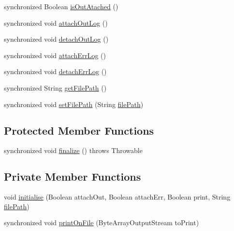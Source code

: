 \begin{DoxyCompactItemize}
\item 
synchronized Boolean \hyperlink{classit_1_1emarolab_1_1cagg_1_1debugging_1_1StandaloneDebuggingText_1_1ConsoleLogRidirector_a804a55248c706a5db8e875ab8ed59cf7}{is\-Out\-Atached} ()
\item 
synchronized void \hyperlink{classit_1_1emarolab_1_1cagg_1_1debugging_1_1StandaloneDebuggingText_1_1ConsoleLogRidirector_a538da7a18aa85fae0a67425392e3fa26}{attach\-Out\-Log} ()
\item 
synchronized void \hyperlink{classit_1_1emarolab_1_1cagg_1_1debugging_1_1StandaloneDebuggingText_1_1ConsoleLogRidirector_a09c385b8ae75ac69a66ee5d28a423b44}{detach\-Out\-Log} ()
\item 
synchronized void \hyperlink{classit_1_1emarolab_1_1cagg_1_1debugging_1_1StandaloneDebuggingText_1_1ConsoleLogRidirector_a64337c563f96a2a9409d033805e8e7bb}{attach\-Err\-Log} ()
\item 
synchronized void \hyperlink{classit_1_1emarolab_1_1cagg_1_1debugging_1_1StandaloneDebuggingText_1_1ConsoleLogRidirector_a7a3fd38142e785a9d7ca4e8c1e1626e1}{detach\-Err\-Log} ()
\item 
synchronized String \hyperlink{classit_1_1emarolab_1_1cagg_1_1debugging_1_1StandaloneDebuggingText_1_1ConsoleLogRidirector_af395e57d6316c1d310c9f95eb4252622}{get\-File\-Path} ()
\item 
synchronized void \hyperlink{classit_1_1emarolab_1_1cagg_1_1debugging_1_1StandaloneDebuggingText_1_1ConsoleLogRidirector_acf6077132b5cd8b7ed93ca7cf74f68fa}{set\-File\-Path} (String \hyperlink{classit_1_1emarolab_1_1cagg_1_1debugging_1_1StandaloneDebuggingText_1_1ConsoleLogRidirector_a870d183ab1015b37ba316062225c5ea5}{file\-Path})
\end{DoxyCompactItemize}
\subsection*{Protected Member Functions}
\begin{DoxyCompactItemize}
\item 
synchronized void \hyperlink{classit_1_1emarolab_1_1cagg_1_1debugging_1_1StandaloneDebuggingText_1_1ConsoleLogRidirector_ac2567c04cce44db611b4b8be347e76f9}{finalize} ()  throws Throwable 
\end{DoxyCompactItemize}
\subsection*{Private Member Functions}
\begin{DoxyCompactItemize}
\item 
void \hyperlink{classit_1_1emarolab_1_1cagg_1_1debugging_1_1StandaloneDebuggingText_1_1ConsoleLogRidirector_a41a456f19a9db2131434184bd9f32efa}{initialise} (Boolean attach\-Out, Boolean attach\-Err, Boolean print, String \hyperlink{classit_1_1emarolab_1_1cagg_1_1debugging_1_1StandaloneDebuggingText_1_1ConsoleLogRidirector_a870d183ab1015b37ba316062225c5ea5}{file\-Path})
\item 
synchronized void \hyperlink{classit_1_1emarolab_1_1cagg_1_1debugging_1_1StandaloneDebuggingText_1_1ConsoleLogRidirector_a925440eb456e4d20a359d344b9727d72}{print\-On\-File} (Byte\-Array\-Output\-Stream to\-Print)
\end{DoxyCompactItemize}
